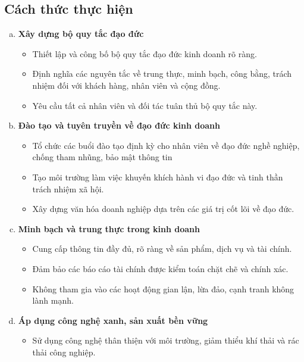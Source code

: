 \documentclass{article}
\begin{document}
\subsection{Cách thức thực hiện}
    \begin{enumerate}[a.]
        \item \textbf{Xây dựng bộ quy tắc đạo đức}
        \begin{itemize}
            \item Thiết lập và công bố bộ quy tắc đạo đức kinh doanh rõ ràng.
            \item Định nghĩa các nguyên tắc về trung thực, minh bạch, công bằng, trách nhiệm đối với khách hàng, nhân viên và cộng đồng.
            \item Yêu cầu tất cả nhân viên và đối tác tuân thủ bộ quy tắc này.
        \end{itemize}
        \item \textbf{Đào tạo và tuyên truyền về đạo đức kinh doanh}
        \begin{itemize}
            \item Tổ chức các buổi đào tạo định kỳ cho nhân viên về đạo đức nghề nghiệp, chống tham nhũng, bảo mật thông tin
            \item Tạo môi trường làm việc khuyến khích hành vi đạo đức và tinh thần trách nhiệm xã hội.
            \item Xây dựng văn hóa doanh nghiệp dựa trên các giá trị cốt lõi về đạo đức.
        \end{itemize}
        \item \textbf{Minh bạch và trung thực trong kinh doanh}
        \begin{itemize}
            \item Cung cấp thông tin đầy đủ, rõ ràng về sản phẩm, dịch vụ và tài chính.
            \item Đảm bảo các báo cáo tài chính được kiểm toán chặt chẽ và chính xác.
            \item Không tham gia vào các hoạt động gian lận, lừa đảo, cạnh tranh không lành mạnh.
        \end{itemize}  
        \item \textbf{Áp dụng công nghệ xanh, sản xuất bền vững}
        \begin{itemize}
            \item Sử dụng công nghệ thân thiện với môi trường, giảm thiểu khí thải và rác thải công nghiệp.

\end{itemize}
\end{enumerate}
\end{document}
